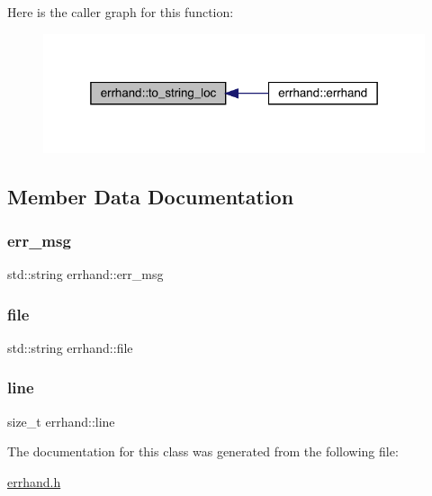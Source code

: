 Here is the caller graph for this function\+:\nopagebreak
\begin{figure}[H]
\begin{center}
\leavevmode
\includegraphics[width=319pt]{classerrhand_a930df1c197154853159683cb2ad55369_icgraph}
\end{center}
\end{figure}


\subsection{Member Data Documentation}
\mbox{\label{classerrhand_a2baa975c76a80afce9c97575c549058c}} 
\subsubsection{\texorpdfstring{err\+\_\+msg}{err\_msg}}
{\footnotesize\ttfamily std\+::string errhand\+::err\+\_\+msg\hspace{0.3cm}{\ttfamily [private]}}

\mbox{\label{classerrhand_aed73d7a312fae4b4387d8d2487277a74}} 
\subsubsection{\texorpdfstring{file}{file}}
{\footnotesize\ttfamily std\+::string errhand\+::file\hspace{0.3cm}{\ttfamily [private]}}

\mbox{\label{classerrhand_a3ddc204c758b97e7d1550019e4513f3b}} 
\subsubsection{\texorpdfstring{line}{line}}
{\footnotesize\ttfamily size\+\_\+t errhand\+::line\hspace{0.3cm}{\ttfamily [private]}}



The documentation for this class was generated from the following file\+:\begin{DoxyCompactItemize}
\item 
\mbox{\hyperlink{errhand_8h}{errhand.\+h}}\end{DoxyCompactItemize}
